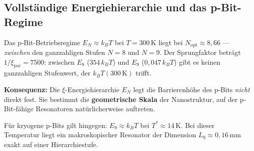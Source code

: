 	\subsection{Vollständige Energiehierarchie und das p-Bit-Regime}
	\label{subsec:tabelle-energien}
	
	\begin{center}
	\end{center}
	
	\begin{important}
		Das p-Bit-Betriebsregime $E_N \approx k_B T$ bei $T = 300\,\text{K}$
		liegt bei $N_\text{opt} \approx 8{,}66$ --- \emph{zwischen} den
		ganzzahligen Stufen $N=8$ und $N=9$. Der Sprungfaktor beträgt
		$1/\xi_\text{par} = 7500$: zwischen $E_8$ ($354\,k_BT$) und
		$E_9$ ($0{,}047\,k_BT$) gibt es keinen ganzzahligen Stufenwert,
		der $k_BT(300\,\text{K})$ trifft.
		
		\textbf{Konsequenz:} Die $\xi$-Energiehierarchie $E_N$ legt die
		Barrierenhöhe des p-Bits \emph{nicht} direkt fest. Sie bestimmt
		die \textbf{geometrische Skala} der Nanostruktur, auf der
		p-Bit-fähige Resonatoren natürlicherweise auftreten.
		
		Für kryogene p-Bits gilt hingegen: $E_9 \approx k_BT$ bei
		$T^* \approx 14\,\text{K}$. Bei dieser Temperatur liegt ein
		makroskopischer Resonator der Dimension $L_9 \approx 0{,}16\,\text{mm}$
		exakt auf einer Hierarchiestufe.
	\end{important}
	
